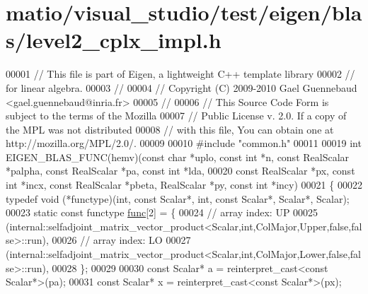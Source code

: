 \hypertarget{matio_2visual__studio_2test_2eigen_2blas_2level2__cplx__impl_8h_source}{}\section{matio/visual\+\_\+studio/test/eigen/blas/level2\+\_\+cplx\+\_\+impl.h}
\label{matio_2visual__studio_2test_2eigen_2blas_2level2__cplx__impl_8h_source}

\begin{DoxyCode}
00001 \textcolor{comment}{// This file is part of Eigen, a lightweight C++ template library}
00002 \textcolor{comment}{// for linear algebra.}
00003 \textcolor{comment}{//}
00004 \textcolor{comment}{// Copyright (C) 2009-2010 Gael Guennebaud <gael.guennebaud@inria.fr>}
00005 \textcolor{comment}{//}
00006 \textcolor{comment}{// This Source Code Form is subject to the terms of the Mozilla}
00007 \textcolor{comment}{// Public License v. 2.0. If a copy of the MPL was not distributed}
00008 \textcolor{comment}{// with this file, You can obtain one at http://mozilla.org/MPL/2.0/.}
00009 
00010 \textcolor{preprocessor}{#include "common.h"}
00011 
00019 \textcolor{keywordtype}{int} EIGEN\_BLAS\_FUNC(hemv)(\textcolor{keyword}{const} \textcolor{keywordtype}{char} *uplo, \textcolor{keyword}{const} \textcolor{keywordtype}{int} *n, \textcolor{keyword}{const} RealScalar *palpha, \textcolor{keyword}{const} RealScalar *pa, \textcolor{keyword}{
      const} \textcolor{keywordtype}{int} *lda,
00020                           \textcolor{keyword}{const} RealScalar *px, \textcolor{keyword}{const} \textcolor{keywordtype}{int} *incx, \textcolor{keyword}{const} RealScalar *pbeta, RealScalar *py, \textcolor{keyword}{
      const} \textcolor{keywordtype}{int} *incy)
00021 \{
00022   \textcolor{keyword}{typedef} void (*functype)(int, \textcolor{keyword}{const} Scalar*, int, \textcolor{keyword}{const} Scalar*, Scalar*, Scalar);
00023   \textcolor{keyword}{static} \textcolor{keyword}{const} functype \hyperlink{structfunc}{func}[2] = \{
00024     \textcolor{comment}{// array index: UP}
00025     (internal::selfadjoint\_matrix\_vector\_product<Scalar,int,ColMajor,Upper,false,false>::run),
00026     \textcolor{comment}{// array index: LO}
00027     (internal::selfadjoint\_matrix\_vector\_product<Scalar,int,ColMajor,Lower,false,false>::run),
00028   \};
00029 
00030   \textcolor{keyword}{const} Scalar* a = \textcolor{keyword}{reinterpret\_cast<}\textcolor{keyword}{const }Scalar*\textcolor{keyword}{>}(pa);
00031   \textcolor{keyword}{const} Scalar* x = \textcolor{keyword}{reinterpret\_cast<}\textcolor{keyword}{const }Scalar*\textcolor{keyword}{>}(px);

\end{DoxyCode}
